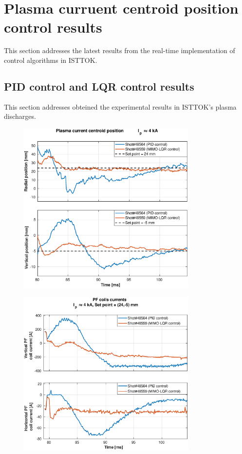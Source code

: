 \section{Plasma curruent centroid position control results}

This section addresses the latest results from the real-time implementation of control algorithms in ISTTOK. 

\subsection{PID control and LQR control results}

This section addresses obteined the experimental results in ISTTOK's plasma discharges.

\begin{figure}
	\centering
	\includegraphics[width=0.8\textwidth]{Chp5/PIDvsMIMO_564_559_2.eps}
	\label{564_559}
\end{figure}

\begin{figure}
	\centering
	\includegraphics[width=0.8\textwidth]{Chp5/PIDvsMIMO_564_559_curr_2.eps}
	\label{564_559curr}
\end{figure}


